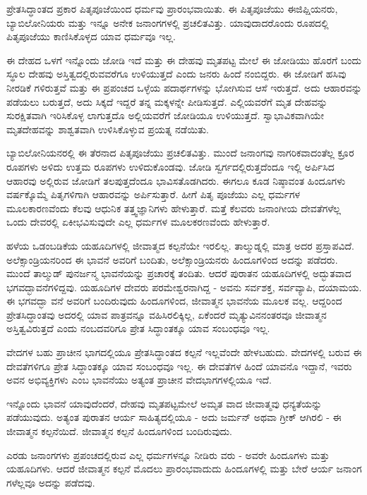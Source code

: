 ಪ್ರೇತಸಿದ್ಧಾಂತದ ಪ್ರಕಾರ ಪಿತೃಪೂಜೆಯಿಂದ ಧರ್ಮವು ಪ್ರಾರಂಭವಾಯಿತು. ಈ ಪಿತೃಪೂಜೆಯು ಈಜಿಪ್ಷಿಯನರು, ಬ್ಯಾಬಿಲೋನಿಯರು ಮತ್ತು ಇನ್ನೂ ಅನೇಕ ಜನಾಂಗಗಳಲ್ಲಿ ಪ್ರಚಲಿತವಿತ್ತು. ಯಾವುದಾದರೊಂದು ರೂಪದಲ್ಲಿ ಪಿತೃಪೂಜೆಯು ಕಾಣಿಸಿಕೊಳ್ಳದ ಯಾವ ಧರ್ಮವೂ ಇಲ್ಲ.

ಈ ದೇಹದ ಒಳಗೆ ಇನ್ನೊಂದು ಜೋಡಿ ಇದೆ ಮತ್ತು ಈ ದೇಹವು ಮೃತಪಟ್ಟ ಮೇಲೆ ಈ ಜೋಡಿಯು ಹೊರಗೆ ಬಂದು ಸ್ಥೂಲ ದೇಹವು ಅಸ್ತಿತ್ವದಲ್ಲಿರುವವರೆಗೂ ಉಳಿಯುತ್ತದೆ ಎಂದು ಜನರು ಹಿಂದೆ ನಂಬಿದ್ದರು. ಈ ಜೋಡಿಗೆ ಹಸಿವು ನೀರಡಿಕೆ ಗಳಿರುತ್ತವೆ ಮತ್ತು ಈ ಪ್ರಪಂಚದ ಒಳ್ಳೆಯ ಪದಾರ್ಥಗಳನ್ನು ಭೋಗಿಸುವ ಆಸೆ ಇರುತ್ತದೆ. ಅದು ಆಹಾರವನ್ನು ಪಡೆಯಲು ಬರುತ್ತದೆ, ಅದು ಸಿಕ್ಕದೆ ಇದ್ದರೆ ತನ್ನ ಮಕ್ಕಳನ್ನೇ ಪೀಡಿಸುತ್ತದೆ. ಎಲ್ಲಿಯವರೆಗೆ ಮೃತ ದೇಹವನ್ನು ಸುರಕ್ಷಿತವಾಗಿ ಇರಿಸಿಕೊಳ್ಳ ಲಾಗುತ್ತದೊ ಅಲ್ಲಿಯವರೆಗೆ ಜೋಡಿಯೂ ಉಳಿಯುತ್ತದೆ. ಸ್ವಾಭಾವಿಕವಾಗಿಯೇ ಮೃತದೇಹವನ್ನು ಶಾಶ್ವತವಾಗಿ ಉಳಿಸಿಕೊಳ್ಳುವ ಪ್ರಯತ್ನ ನಡೆಯಿತು.

ಬ್ಯಾಬಿಲೋನಿಯನರಲ್ಲಿ ಈ ತೆರನಾದ ಪಿತೃಪೂಜೆಯು ಪ್ರಚಲಿತವಿತ್ತು. ಮುಂದೆ ಜನಾಂಗವು ನಾಗರಿಕವಾದಂತೆಲ್ಲ ಕ್ರೂರ ರೂಪಗಳು ಅಳಿದು ಉತ್ತಮ ರೂಪಗಳು ಉಳಿದುಕೊಂಡವು. ಜೋಡಿ ಸ್ವರ್ಗದಲ್ಲಿರುತ್ತದೆಂದೂ ಇಲ್ಲಿ ಅರ್ಪಿಸಿದ ಆಹಾರವು ಅಲ್ಲಿರುವ ಜೋಡಿಗೆ ತಲಪುತ್ತದೆಂದೂ ಭಾವಿಸತೊಡಗಿದರು. ಈಗಲೂ ಕೂಡ ನಿಷ್ಠಾವಂತ ಹಿಂದೂಗಳು ವರ್ಷಕ್ಕೊಮ್ಮೆ ಪಿತೃಗಳಿಗಾಗಿ ಆಹಾರವನ್ನು ಅರ್ಪಿಸುತ್ತಾರೆ. ಹೀಗೆ ಪಿತೃ ಪೂಜೆಯು ಎಲ್ಲ ಧರ್ಮಗಳ ಮೂಲಕಾರಣವೆಂದು ಕೆಲವು ಆಧುನಿಕ ತತ್ತ್ವಜ್ಞಾನಿಗಳು ಹೇಳುತ್ತಾರೆ. ಮತ್ತೆ ಕೆಲವರು ಜನಾಂಗೀಯ ದೇವತೆಗಳೆಲ್ಲ ಒಂದು ದೇವರಲ್ಲಿ ಏಕೀಭವಿಸುವುದೇ ಎಲ್ಲ ಧರ್ಮಗಳ ಮೂಲಕರಣವೆಂದು ಹೇಳುತ್ತಾರೆ.

ಹಳೆಯ ಒಡಂಬಡಿಕೆಯ ಯಹೂದಿಗಳಲ್ಲಿ ಜೀವಾತ್ಮದ ಕಲ್ಪನೆಯೇ ಇರಲಿಲ್ಲ. ತಾಲ್ಮುಡ್ನಲ್ಲಿ ಮಾತ್ರ ಅದರ ಪ್ರಸ್ತಾಪವಿದೆ. ಅಲೆಕ್ಸಾಂಡ್ರಿಯನರಿಂದ ಈ ಭಾವನೆ ಅವರಿಗೆ ಬಂದಿತು, ಅಲೆಕ್ಸಾಂಡ್ರಿಯನರು ಹಿಂದೂಗಳಿಂದ ಅದನ್ನು ಪಡೆದರು. ಮುಂದೆ ತಾಲ್ಮುಡ್ ಪುನರ್ಜನ್ಮ ಭಾವನೆಯನ್ನು ಪ್ರಚಾರಕ್ಕೆ ತಂದಿತು. ಆದರೆ ಪುರಾತನ ಯಹೂದಿಗಳಲ್ಲಿ ಅದ್ಭುತವಾದ ಭಗವದ್ಭಾವನೆಗಳಿದ್ದವು. ಯಹೂದಿಗಳ ದೇವರು ಪರಮೇಶ್ವರನಾಗಿದ್ದ - ಅವನು ಸರ್ವಶಕ್ತ, ಸರ್ವವ್ಯಾಪಿ, ದಯಾಮಯ. ಈ ಭಗವದ್ಭಾ ವನೆ ಅವರಿಗೆ ಬಂದಿರುವುದು ಹಿಂದೂಗಳಿಂದ, ಜೀವಾತ್ಮನ ಭಾವನೆಯ ಮೂಲಕ ವಲ್ಲ. ಆದ್ದರಿಂದ ಪ್ರೇತಸಿದ್ಧಾಂತವು ಅದರಲ್ಲಿ ಯಾವ ಪಾತ್ರವನ್ನೂ ವಹಿಸಿರಲಿಕ್ಕಿಲ್ಲ, ಏಕೆಂದರೆ ಮೃತ್ಯುವಿನನಂತರವೂ ಜೀವಾತ್ಮನ ಅಸ್ತಿತ್ವವಿರುತ್ತದೆ ಎಂದು ನಂಬದವರಿಗೂ ಪ್ರೇತ ಸಿದ್ಧಾಂತಕ್ಕೂ ಯಾವ ಸಂಬಂಧವೂ ಇಲ್ಲ.

ವೇದಗಳ ಬಹು ಪ್ರಾಚೀನ ಭಾಗದಲ್ಲಿಯೂ ಪ್ರೇತಸಿದ್ಧಾಂತದ ಕಲ್ಪನೆ ಇಲ್ಲವೆಂದೇ ಹೇಳಬಹುದು. ವೇದಗಳಲ್ಲಿ ಬರುವ ಈ ದೇವತೆಗಳಿಗೂ ಪ್ರೇತ ಸಿದ್ಧಾಂತಕ್ಕೂ ಯಾವ ಸಂಬಂಧವೂ ಇಲ್ಲ. ಈ ದೇವತೆಗಳ ಹಿಂದೆ ಯಾವನೊ ಇದ್ದಾನೆ, ಇವರು ಅವನ ಅಭಿವ್ಯಕ್ತಿಗಳು ಎಂಬ ಭಾವನೆಯು ಅತ್ಯಂತ ಪ್ರಾಚೀನ ವೇದಭಾಗಗಳಲ್ಲಿಯೂ ಇದೆ.

ಇನ್ನೊಂದು ಭಾವನೆ ಯಾವುದೆಂದರೆ, ದೇಹವು ಮೃತಪಟ್ಟಮೇಲೆ ಅಮೃತ ವಾದ ಜೀವಾತ್ಮವು ಧನ್ಯತೆಯನ್ನು ಪಡೆಯುವುದು. ಅತ್ಯಂತ ಪುರಾತನ ಆರ್ಯ ಸಾಹಿತ್ಯದಲ್ಲಿಯೂ - ಅದು ಜರ್ಮನ್ ಅಥವಾ ಗ್ರೀಕ್ ಆಗಿರಲಿ - ಈ ಜೀವಾತ್ಮನ ಕಲ್ಪನೆಯಿದೆ. ಜೀವಾತ್ಮನ ಕಲ್ಪನೆ ಹಿಂದೂಗಳಿಂದ ಬಂದಿರುವುದು.

ಎರಡು ಜನಾಂಗಗಳು ಪ್ರಪಂಚದಲ್ಲಿರುವ ಎಲ್ಲ ಧರ್ಮಗಳನ್ನೂ ನೀಡಿರು ವರು - ಅವರೇ ಹಿಂದೂಗಳು ಮತ್ತು ಯಹೂದಿಗಳು. ಆದರೆ ಜೀವಾತ್ಮನ ಕಲ್ಪನೆ ಮೊದಲು ಪ್ರಾರಂಭವಾದುದು ಹಿಂದೂಗಳಲ್ಲಿ ಮತ್ತು ಬೇರೆ ಆರ್ಯ ಜನಾಂಗ ಗಳೆಲ್ಲವೂ ಅದನ್ನು ಪಡೆದವು.

